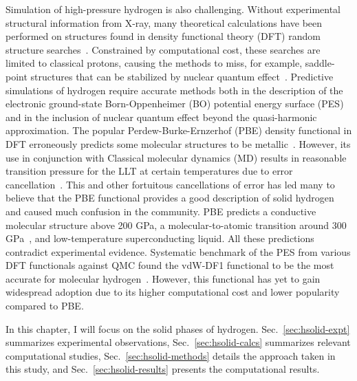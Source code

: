Simulation of high-pressure hydrogen is also challenging. Without experimental structural information from X-ray, many theoretical calculations have been performed on structures found in density functional theory (DFT) random structure searches~\cite{Pickard2007}. Constrained by computational cost, these searches are limited to classical protons, causing the methods to miss, for example, saddle-point structures that can be stabilized by nuclear quantum effect~\cite{Monserrat2016}.
Predictive simulations of hydrogen require accurate methods both in the description of the electronic ground-state Born-Oppenheimer (BO) potential energy surface (PES) and in the inclusion of nuclear quantum effect beyond the quasi-harmonic approximation.
The popular Perdew-Burke-Ernzerhof (PBE) density functional in DFT erroneously predicts some molecular structures to be metallic~\cite{Drummond2015}. However, its use in conjunction with Classical molecular dynamics (MD) results in reasonable transition pressure for the LLT at certain temperatures due to error cancellation~\cite{Morales2013a}.
This and other fortuitous cancellations of error has led many to believe that the PBE functional provides a good description of solid hydrogen and caused much confusion in the community. PBE predicts a conductive molecular structure above 200 GPa, a molecular-to-atomic transition around 300 GPa~\cite{McMinis2015}, and low-temperature superconducting liquid. All these predictions contradict experimental evidence. Systematic benchmark of the PES from various DFT functionals against QMC found the vdW-DF1 functional to be the most accurate for molecular hydrogen~\cite{Clay2016}. However, this functional has yet to gain widespread adoption due to its higher computational cost and lower popularity compared to PBE.

In this chapter, I will focus on the solid phases of hydrogen. Sec.~\ref{sec:hsolid-expt} summarizes experimental observations, Sec.~\ref{sec:hsolid-calcs} summarizes relevant computational studies,
Sec.~\ref{sec:hsolid-methods} details the approach taken in this study,
and Sec.~\ref{sec:hsolid-results} presents the computational results.

